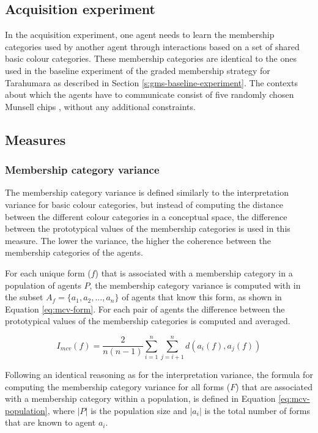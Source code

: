 \subsection{Acquisition experiment}

In the acquisition experiment, one agent needs to learn the membership
categories used by another agent through interactions based on a set
of shared basic colour categories. These membership categories are
identical to the ones used in the baseline experiment of the
graded membership strategy for Tarahumara as described in
Section \ref{s:gms-baseline-experiment}. The contexts about which the
agents have to communicate consist of five randomly chosen Munsell
chips \citep{newhall42final}, without any additional constraints.

\subsection{Measures}

\subsubsection{Membership category variance}

The membership category variance is defined similarly to the
interpretation variance for basic colour categories, but instead of
computing the distance between the different colour categories in a
conceptual space, the difference between the prototypical values of
the membership categories is used in this measure. The lower the
variance, the higher the coherence between the membership categories
of the agents.

For each unique form ($f$) that is associated with a membership category
in a population of agents $P$, the membership category variance is
computed with in the subset $A_f = \{a_1, a_2, ..., a_n\}$ of agents
that know this form, as shown in Equation \ref{eq:mcv-form}. For each
pair of agents the difference between the prototypical values of the
membership categories is computed and averaged.

\begin{equation}
I_{mcv}(f) = \frac{2}{n(n-1)} \sum^n_{i=1} \sum^n_{j=i+1} d(a_i(f), a_j(f))
\label{eq:mcv-form}
\end{equation}

Following an identical reasoning as for the interpretation variance,
the formula for computing the membership category variance for all
forms ($F$) that are associated with a membership category within a
population, is defined in Equation \ref{eq:mcv-population}, where
$|P|$ is the population size and $|a_i|$ is the total number of forms
that are known to agent $a_i$.

